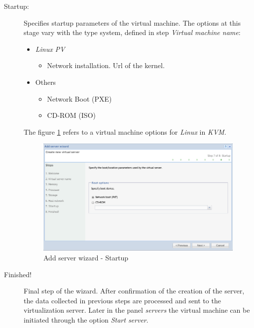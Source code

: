 \begin{description}
        \item[Startup:] Specifies startup parameters of the virtual machine. The options at this stage vary with the type system, defined in step \emph{Virtual machine name}:		\label{sec:add_server_boot}
        \begin{itemize}
			\item \emph{Linux PV}
				\begin{itemize}
					\item Network installation. Url of the kernel.
				\end{itemize}
			\item Others
				\begin{itemize}
					\item Network Boot (PXE)
					\item CD-ROM (ISO)
				\end{itemize}
		\end{itemize}
        The figure \ref{fig:server_createwiz_startup} refers to a virtual machine options for \emph{Linux} in \emph{KVM}.

		\begin{figure}[H]
			\begin{center}
			\includegraphics[scale=0.5]{screenshots/server_createwiz_startup.png}
			\caption{Add server wizard - Startup}
			\label{fig:server_createwiz_startup}
			\end{center}
		\end{figure}

	\item[Finished!] Final step of the wizard. After confirmation of the creation of the server, the data collected in previous steps are processed and sent to the virtualization server. Later in the panel \emph{servers} the virtual machine can be initiated through the option \emph{Start server}.


\end{description}
